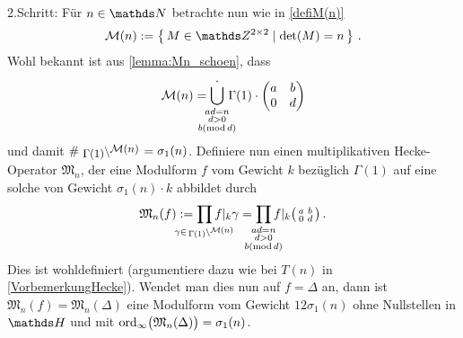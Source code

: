\begin{bewe}
2.Schritt: Für $n \in \NN$ betrachte nun wie in \autoref{defiM(n)}
\[
\mathcal{M}(n) := \Set{M \in \ZZ^{2 \times 2} \mid \det (M) = n}
\,.
\]
Wohl bekannt ist aus \autoref{lemma:Mn_schoen}, dass 
\[
\mathcal{M}(n) = \smashoperator{\bigcup_{\substack{ad = n\\ d > 0\\b (\operatorname{mod} d)}}^{\boldsymbol \cdot}} \, \Gamma(1) \cdot 
\begin{pmatrix}
a & b\\
0 & d
\end{pmatrix}
\]
und damit $\# \linksmodulo{\Gamma(1)}{\mathcal{M}(n)} = \sigma_1(n)$. Definiere nun einen \glqq{}multiplikativen Hecke-Operator\grqq{} $\mathfrak{M}_n$, der eine Modulform $f$ vom Gewicht $k$ bezüglich $\Gamma(1)$ auf eine solche von Gewicht $\sigma_1 (n) \cdot k$ abbildet durch
\begin{equation}
\label{Gl 1}
\mathfrak{M}_n (f) := \smashoperator{\prod_{\gamma \in \linksmodulo{\Gamma(1)}{\mathcal M(n)}}} f |_k \gamma = \smashoperator{\prod_{\substack{ad = n\\ d > 0\\b (\operatorname{mod} d)}}} f |_k \mymat{a}{b}{0}{d}
\,.
\end{equation}
Dies ist wohldefiniert (argumentiere dazu wie bei $T(n)$ in \autoref{VorbemerkungHecke}). Wendet man dies nun auf $f = \Delta$ an, dann ist $\mathfrak{M}_n(f) = \mathfrak{M}_n(\Delta)$ eine Modulform vom Gewicht $12 \sigma_1(n)$ ohne Nullstellen in $\HH$ und mit $\operatorname{ord}_\infty \bigl( \mathfrak{M}_n(\Delta) \bigr) = \sigma_1(n)$.


\end{bewe}
